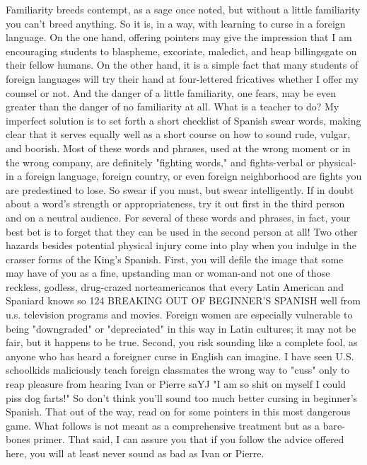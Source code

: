 \documentclass[14pt,a4paper,oneside]{memoir}
\begin{document}
Familiarity breeds contempt, as a sage once noted, but without
a little familiarity you can't breed anything. So it is, in a way, with
learning to curse in a foreign language. On the one hand, offering pointers may give the impression that I am encouraging students to blaspheme, excoriate, maledict, and heap billingsgate on their fellow humans. On the other hand, it is a simple fact that many students of
foreign languages will try their hand at four-lettered fricatives whether
I offer my counsel or not. And the danger of a little familiarity, one
fears, may be even greater than the danger of no familiarity at all. What
is a teacher to do?
My imperfect solution is to set forth a short checklist of Spanish swear words, making clear that it serves equally well as a short
course on how to sound rude, vulgar, and boorish. Most of these words
and phrases, used at the wrong moment or in the wrong company, are
definitely "fighting words," and fights-verbal or physical-in a foreign language, foreign country, or even foreign neighborhood are fights
you are predestined to lose. So swear if you must, but swear intelligently. If in doubt about a word's strength or appropriateness, try it out
first in the third person and on a neutral audience. For several of these
words and phrases, in fact, your best bet is to forget that they can be
used in the second person at all!
Two other hazards besides potential physical injury come into
play when you indulge in the crasser forms of the King's Spanish. First,
you will defile the image that some may have of you as a fine, upstanding man or woman-and not one of those reckless, godless, drug-crazed
norteamericanos that every Latin American and Spaniard knows so
124 BREAKING OUT OF BEGINNER'S SPANISH
well from u.s. television programs and movies. Foreign women are especially vulnerable to being "downgraded" or "depreciated" in this
way in Latin cultures; it may not be fair, but it happens to be true.
Second, you risk sounding like a complete fool, as anyone who
has heard a foreigner curse in English can imagine. I have seen U.S.
schoolkids maliciously teach foreign classmates the wrong way to
"cuss" only to reap pleasure from hearing Ivan or Pierre saYJ "I am so
shit on myself I could piss dog farts!" So don't think you'll sound too
much better cursing in beginner's Spanish. That out of the way, read
on for some pointers in this most dangerous game. What follows is not
meant as a comprehensive treatment but as a bare-bones primer. That
said, I can assure you that if you follow the advice offered here, you
will at least never sound as bad as Ivan or Pierre.
\end{document}
